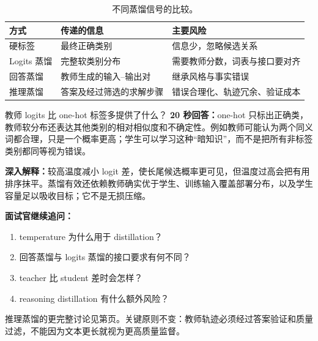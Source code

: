 \begin{table}[htbp]
\centering
\small
\begin{tabularx}{0.94\textwidth}{lYY}
\toprule
方式 & 传递的信息 & 主要风险\\
\midrule
硬标签 & 最终正确类别 & 信息少，忽略候选关系\\
Logits 蒸馏 & 完整软类别分布 & 需要教师分数，词表与接口要对齐\\
回答蒸馏 & 教师生成的输入--输出对 & 继承风格与事实错误\\
推理蒸馏 & 答案及经过筛选的求解步骤 & 错误合理化、轨迹冗余、验证成本\\
\bottomrule
\end{tabularx}
\caption{不同蒸馏信号的比较。}
\end{table}

\begin{interviewbox}{教师 logits 比 one-hot 标签多提供了什么？}
\textbf{20 秒回答：}one-hot 只标出正确类，教师软分布还表达其他类别的相对相似度和不确定性。例如教师可能认为两个同义词都合理，只是一个概率更高；学生可以学习这种“暗知识”，而不是把所有非标签类别都同等视为错误。

\textbf{深入解释：}较高温度减小 logit 差，使长尾候选概率更可见，但温度过高会把有用排序抹平。蒸馏有效还依赖教师确实优于学生、训练输入覆盖部署分布，以及学生容量足以吸收目标；它不是无损压缩。

\textbf{面试官继续追问：}
\begin{enumerate}
  \item temperature 为什么用于 distillation？
  \item 回答蒸馏与 logits 蒸馏的接口要求有何不同？
  \item teacher 比 student 差时会怎样？
  \item reasoning distillation 有什么额外风险？
\end{enumerate}
\end{interviewbox}

推理蒸馏的更完整讨论见第\pageref{sec:reasoning-distillation}页。关键原则不变：教师轨迹必须经过答案验证和质量过滤，不能因为文本更长就视为更高质量监督。
